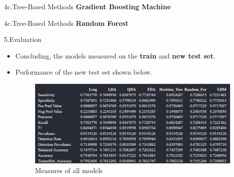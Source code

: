 \documentclass[xcolor=dvipsnames]{beamer}
\begin{document}
\begin{frame}{4c.Tree-Based Methods}
\textbf{Gradient Boosting Machine}
\end{frame}

\begin{frame}{4c.Tree-Based Methods}
\textbf{ Random Forest}
\end{frame}

\begin{frame}{5.Evaluation}
\begin{itemize}
\item Concluding, the models measured on the \textbf{train} and \textbf{new test set}.
\item Performance of the new test set shown below.
\begin{figure}
    \centering
    \includegraphics[scale= 0.45]{Evaluation.png}
    \caption{Measures of all models}
    \label{fig:my_label}
\end{figure}
\end{itemize}
\end{frame}
\end{document}
